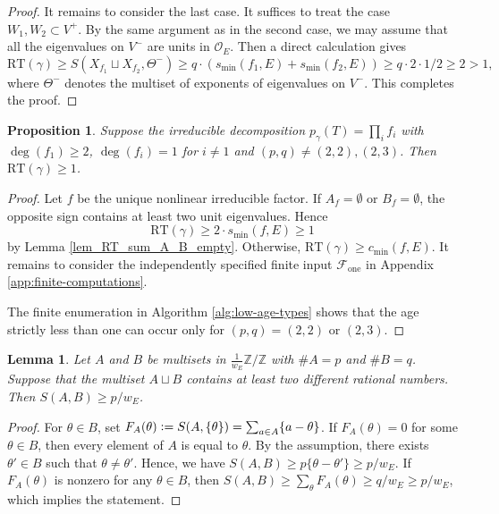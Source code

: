 \documentclass[11pt]{amsart}
\theoremstyle{plain}
\newtheorem{lem}[thm]{Lemma}
\newtheorem{prop}[thm]{Proposition}
\theoremstyle{definition}
\numberwithin{equation}{section}
\def\OO{\mathscr{O}}
\newcommand{\bbZ}{\mathbb{Z}}
\newcommand{\defeq}{\vcentcolon=}
\begin{document}
\begin{proof}
  It remains to consider the last case.
  It suffices to treat the case $W_1,W_2\subset V^+$.
  By the same argument as in the second case, we may assume that all the eigenvalues on $V^-$ are units in $\OO_E$.
  Then a direct calculation gives
  \[
    \mathrm{RT}(\gamma) \geq S(X_{f_1} \sqcup X_{f_2}, \Theta^-) \geq q \cdot (s_{\min}(f_1,E) + s_{\min}(f_2,E)) \geq q \cdot 2 \cdot 1/2 \geq 2 > 1,
  \]
  where $\Theta^-$ denotes the multiset of exponents of eigenvalues on $V^-$.
  This completes the proof.
\end{proof}







\begin{prop}\label{prop_one_nonlinear_factor}
  Suppose the irreducible decomposition $p_\gamma(T) = \prod_i f_i$ with $\deg(f_1)\geq 2$, $\deg(f_i)=1$ for $i\neq 1$ and $(p,q) \neq (2,2), (2,3)$.
  Then $\mathrm{RT}(\gamma) \geq 1$.
\end{prop}

\begin{proof}
Let $f$ be the unique nonlinear irreducible factor.
If $A_f=\emptyset$ or $B_f=\emptyset$, the opposite sign
contains at least two unit eigenvalues. Hence
\[
  \mathrm{RT}(\gamma)\geq 2 \cdot s_{\min}(f,E)\geq1
\]
by Lemma \ref{lem_RT_sum_A_B_empty}.
Otherwise, $\mathrm{RT}(\gamma)\geq c_{\min}(f,E)$.
It remains to consider the independently specified finite
input $\mathcal F_{\mathrm{one}}$ in Appendix
\ref{app:finite-computations}.

The finite enumeration in Algorithm \ref{alg:low-age-types} shows that the age strictly less than one
can occur only for $(p,q)=(2,2)$ or $(2,3)$.
\end{proof}

\begin{lem}\label{lem:unit-eigenvalues-interior}
Let $A$ and $B$ be multisets in $\frac{1}{w_E}\bbZ/\bbZ$ with $\#A=p$ and $\#B=q$. 
Suppose that the multiset $A \sqcup B$ contains at least two different rational numbers.
Then $S(A,B) \geq p/w_E$.
\end{lem}
\begin{proof}
For $\theta\in B$, set $F_A(\theta)\defeq S(A,\{\theta\})=\sum_{a\in A}\{a-\theta\}$.
If $F_A(\theta)=0$ for some $\theta \in B$, then every element of $A$ is equal to $\theta$.
By the assumption, there exists $\theta'\in B$ such that $\theta \neq \theta'$.
Hence, we have $S(A,B) \geq p\{\theta-\theta'\} \geq p/w_E$.
If $F_A(\theta)$ is nonzero for any $\theta \in B$, then $S(A,B) \geq \sum_\theta F_A(\theta)\geq q/w_E \geq p/w_E$, which implies the statement.
\end{proof}
\end{document}
